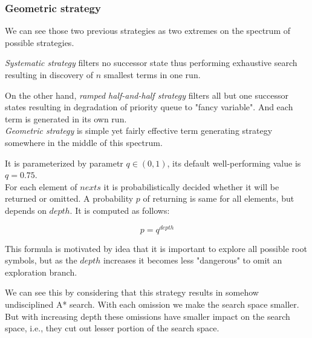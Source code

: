 \documentclass[12pt,a4paper]{report}
\newenvironment{todo}
{ ~\\[0.5em]
  {\color{red}\textbf{TODO}}
  \begin{easylist}[itemize]}
{ \end{easylist}
  ~}
\begin{document}



\subsubsection{Geometric strategy}


We can see those two previous strategies as two extremes on the spectrum of 
possible strategies.

\textit{Systematic strategy} filters no successor state thus performing
exhaustive search resulting in discovery of $n$ smallest terms in one run.

On the other hand, \textit{ramped half-and-half strategy} filters 
all but one successor states resulting in degradation of 
priority queue to "fancy variable". 
And each term is generated in its own run.\\

\textit{Geometric strategy} is simple yet fairly effective term generating 
strategy somewhere in the middle of this spectrum.

It is parameterized by parametr $q \in (0,1)$, its default well-performing 
value is $q = 0.75$. \\

For each element of $nexts$ it is probabilistically decided whether
it will be returned or omitted. A probability $p$ of returning is
same for all elements, but depends on $depth$. 
It is computed as follows:

$$ p = q^{depth} $$
   
This formula is motivated by idea that it is important to
explore all possible root symbols, but as the $depth$ 
increases it becomes less "dangerous" to omit 
an exploration branch. 

We can see this by considering that this strategy results in
somehow undisciplined A* search.
With each omission we make the search space smaller. But with
increasing depth these omissions have smaller impact on the search space,
i.e., they cut out lesser portion of the search space.
\end{document}
